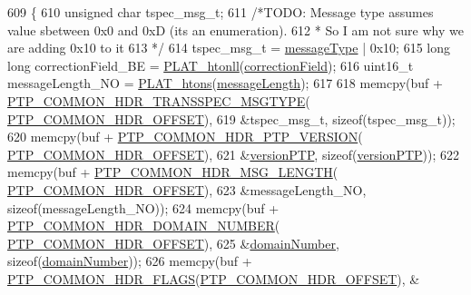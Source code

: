 \begin{DoxyCode}
609 \{
610     \textcolor{keywordtype}{unsigned} \textcolor{keywordtype}{char} tspec\_msg\_t;
611     \textcolor{comment}{/*TODO: Message type assumes value sbetween 0x0 and 0xD (its an enumeration).}
612 \textcolor{comment}{     * So I am not sure why we are adding 0x10 to it}
613 \textcolor{comment}{     */}
614     tspec\_msg\_t = \hyperlink{class_p_t_p_message_common_adb32627aa5b0e2dbad3ccd88aab07c05}{messageType} | 0x10;
615     \textcolor{keywordtype}{long} \textcolor{keywordtype}{long} correctionField\_BE = \hyperlink{linux_2src_2platform_8cpp_af650711ffc00c79514542fa37c393871}{PLAT\_htonll}(\hyperlink{class_p_t_p_message_common_a635b707dac6610b5b159be5c8ec1891e}{correctionField});
616     uint16\_t messageLength\_NO = \hyperlink{linux_2src_2platform_8cpp_aa89fc0aa7465274c200da69771d2a043}{PLAT\_htons}(\hyperlink{class_p_t_p_message_common_a6c490faee54bca860c4d897aae50990f}{messageLength});
617 
618     memcpy(buf + \hyperlink{avbts__message_8hpp_a102fc939e55e08eadb9bf42508fb65d2}{PTP\_COMMON\_HDR\_TRANSSPEC\_MSGTYPE}(
      \hyperlink{avbts__message_8hpp_a330dd502b6e19949d74c8f3a96dd5667}{PTP\_COMMON\_HDR\_OFFSET}),
619            &tspec\_msg\_t, \textcolor{keyword}{sizeof}(tspec\_msg\_t));
620     memcpy(buf + \hyperlink{avbts__message_8hpp_a4b78a578ef002737321ef5c6def6593e}{PTP\_COMMON\_HDR\_PTP\_VERSION}(
      \hyperlink{avbts__message_8hpp_a330dd502b6e19949d74c8f3a96dd5667}{PTP\_COMMON\_HDR\_OFFSET}),
621            &\hyperlink{class_p_t_p_message_common_aebd1e0693c6170ff1b08b2471db92a80}{versionPTP}, \textcolor{keyword}{sizeof}(\hyperlink{class_p_t_p_message_common_aebd1e0693c6170ff1b08b2471db92a80}{versionPTP}));
622     memcpy(buf + \hyperlink{avbts__message_8hpp_a6db27d50a88956a08a99f2eb7b020247}{PTP\_COMMON\_HDR\_MSG\_LENGTH}(
      \hyperlink{avbts__message_8hpp_a330dd502b6e19949d74c8f3a96dd5667}{PTP\_COMMON\_HDR\_OFFSET}),
623            &messageLength\_NO, \textcolor{keyword}{sizeof}(messageLength\_NO));
624     memcpy(buf + \hyperlink{avbts__message_8hpp_aeba19234aadc9ec2ce3ec7b439a79c54}{PTP\_COMMON\_HDR\_DOMAIN\_NUMBER}(
      \hyperlink{avbts__message_8hpp_a330dd502b6e19949d74c8f3a96dd5667}{PTP\_COMMON\_HDR\_OFFSET}),
625            &\hyperlink{class_p_t_p_message_common_a0443527ff087aecea2cac4f6e84d189c}{domainNumber}, \textcolor{keyword}{sizeof}(\hyperlink{class_p_t_p_message_common_a0443527ff087aecea2cac4f6e84d189c}{domainNumber}));
626     memcpy(buf + \hyperlink{avbts__message_8hpp_a60148b9c4d7f51e723a3ae8dd73e7851}{PTP\_COMMON\_HDR\_FLAGS}(\hyperlink{avbts__message_8hpp_a330dd502b6e19949d74c8f3a96dd5667}{PTP\_COMMON\_HDR\_OFFSET}), &

\end{DoxyCode}
